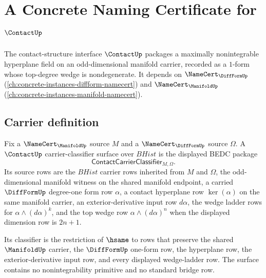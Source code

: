 \chapter{A Concrete Naming Certificate for $\ContactUp$}
\label{ch:concrete-instances-contact-namecert}

The contact-structure interface $\ContactUp$ packages a maximally nonintegrable hyperplane field on an odd-dimensional manifold carrier, recorded as a $1$-form whose top-degree wedge is nondegenerate. It depends on $\NameCert_{\DiffFormUp}$ (\autoref{ch:concrete-instances-diffform-namecert}) and $\NameCert_{\ManifoldUp}$ (\autoref{ch:concrete-instances-manifold-namecert}).

\section{Carrier definition}
\label{sec:contact-carrier}

\begin{definition}
\label{def:contactup-carrier-classifier-surface}
Fix a $\NameCert_{\ManifoldUp}$ source $M$ and a $\NameCert_{\DiffFormUp}$ source $\Omega$. A $\ContactUp$ carrier-classifier surface over $BHist$ is the displayed BEDC package
$$
\mathsf{ContactCarrierClassifier}_{M,\Omega}.
$$
Its source rows are the $BHist$ carrier rows inherited from $M$ and $\Omega$, the odd-dimensional manifold witness on the shared manifold endpoint, a carried $\DiffFormUp$ degree-one form row $\alpha$, a contact hyperplane row $\ker(\alpha)$ on the same manifold carrier, an exterior-derivative input row $d\alpha$, the wedge ladder rows for $\alpha\wedge(d\alpha)^k$, and the top wedge row $\alpha\wedge(d\alpha)^n$ when the displayed dimension row is $2n+1$.

Its classifier is the restriction of $\hsame$ to rows that preserve the shared $\ManifoldUp$ carrier, the $\DiffFormUp$ one-form row, the hyperplane row, the exterior-derivative input row, and every displayed wedge-ladder row. The surface contains no nonintegrability primitive and no standard bridge row.
\end{definition}

